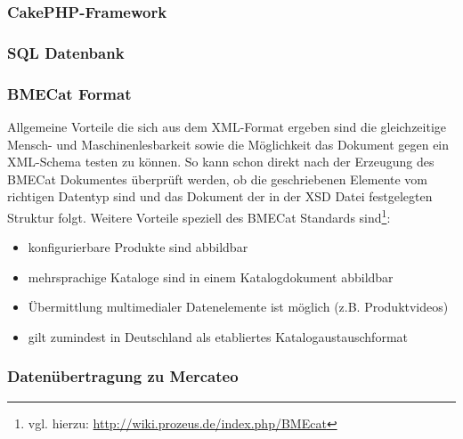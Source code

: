 		
	\subsubsection{CakePHP-Framework}
	
	
	
	\subsubsection{SQL Datenbank}
	
	
	\subsubsection{BMECat Format}
	
	Allgemeine Vorteile die sich aus dem XML-Format ergeben sind die gleichzeitige Mensch- und Maschinenlesbarkeit sowie die Möglichkeit das Dokument gegen ein XML-Schema testen zu können. So kann schon direkt nach der Erzeugung des BMECat Dokumentes überprüft werden, ob die geschriebenen Elemente vom richtigen Datentyp sind und das Dokument der in der XSD Datei festgelegten Struktur folgt. Weitere Vorteile speziell des BMECat Standards sind\footnote{vgl. hierzu: \url{http://wiki.prozeus.de/index.php/BMEcat}}:
	
	\begin{itemize}
	\item konfigurierbare Produkte sind abbildbar
	\item mehrsprachige Kataloge sind in einem Katalogdokument abbildbar
	\item Übermittlung multimedialer Datenelemente ist möglich (z.B. Produktvideos)	
	\item gilt zumindest in Deutschland als etabliertes Katalogaustauschformat	
	\end{itemize}
	
	
	
	\subsubsection{Datenübertragung zu Mercateo}
	
